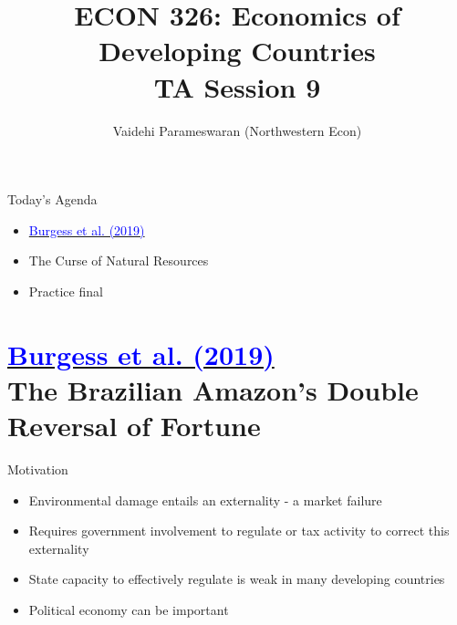 \documentclass[11pt,notes=hide,aspectratio=169,mathserif]{beamer}
\title[class]{ECON 326: Economics of Developing Countries \\ TA Session 9}
\author[vaidehi's class ]{Vaidehi Parameswaran (Northwestern Econ)}
\date{\monthname[\the\month] \the\year}
\begin{document}
\begin{frame}[plain]
\titlepage
\end{frame}


\begin{frame}{Today's Agenda}

\begin{itemize}
\item \href{https://www.lse.ac.uk/economics/Assets/Documents/personal-pages/robin-burgess/the-brazilian-amazons-double-reversal-of-fortune-manuscript.pdf}{\textcolor{blue}{Burgess et al. (2019)}}
\item The Curse of Natural Resources
\item Practice final
\end{itemize}
\end{frame}


\section*{\href{https://www.lse.ac.uk/economics/Assets/Documents/personal-pages/robin-burgess/the-brazilian-amazons-double-reversal-of-fortune-manuscript.pdf}{\textcolor{blue}{Burgess et al. (2019)}} \\[5mm] 
\textnormal{\small{The Brazilian Amazon’s Double Reversal of Fortune}}}

\begin{frame}{Motivation}
\begin{itemize}
\item Environmental damage entails an externality - a market failure 
\item Requires government involvement to regulate or tax activity to correct this externality
\item State capacity to effectively regulate is weak in many developing countries
\item Political economy can be important 
\end{itemize}
\end{frame}
\end{document}
